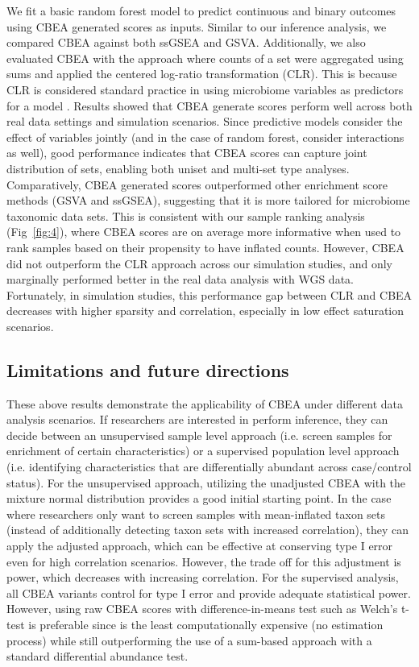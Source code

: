 \documentclass[10pt,letterpaper]{article}
\begin{document}
We fit a basic random forest model \cite{breiman2001} to predict continuous and binary outcomes using CBEA generated scores as inputs. Similar to our inference analysis, we compared CBEA against both ssGSEA and GSVA. Additionally, we also evaluated CBEA with the approach where counts of a set were aggregated using sums and applied the centered log-ratio transformation (CLR). This is because CLR is considered standard practice in using microbiome variables as predictors for a model \cite{gloor2017}. Results showed that CBEA generate scores perform well across both real data settings and simulation scenarios. Since predictive models consider the effect of variables jointly (and in the case of random forest, consider interactions as well), good performance indicates that CBEA scores can capture joint distribution of sets, enabling both uniset and multi-set type analyses. Comparatively, CBEA generated scores outperformed other enrichment score methods (GSVA and ssGSEA), suggesting that it is more tailored for microbiome taxonomic data sets. This is consistent with our sample ranking analysis (Fig~\ref{fig:4}), where CBEA scores are on average more informative when used to rank samples based on their propensity to have inflated counts. However, CBEA did not outperform the CLR approach across our simulation studies, and only marginally performed better in the real data analysis with WGS data. Fortunately, in simulation studies, this performance gap between CLR and CBEA decreases with higher sparsity and correlation, especially in low effect saturation scenarios.  

\subsection*{Limitations and future directions} 

These above results demonstrate the applicability of CBEA under different data analysis scenarios. If researchers are interested in perform inference, they can decide between an unsupervised sample level approach (i.e. screen samples for enrichment of certain characteristics) or a supervised population level approach (i.e. identifying characteristics that are differentially abundant across case/control status). For the unsupervised approach, utilizing the unadjusted CBEA with the mixture normal distribution provides a good initial starting point. In the case where researchers only want to screen samples with mean-inflated taxon sets (instead of additionally detecting taxon sets with increased correlation), they can apply the adjusted approach, which can be effective at conserving type I error even for high correlation scenarios. However, the trade off for this adjustment is power, which decreases with increasing correlation. For the supervised analysis, all CBEA variants control for type I error and provide adequate statistical power. However, using raw CBEA scores with difference-in-means test such as Welch's t-test is preferable since is the least computationally expensive (no estimation process) while still outperforming the use of a sum-based approach with a standard differential abundance test.     
\end{document}
